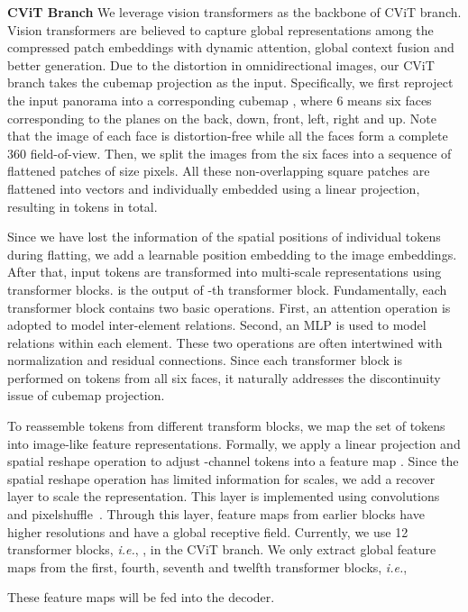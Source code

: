 \documentclass[10pt,twocolumn,letterpaper]{article}
\begin{document}
\textbf{CViT Branch }
We leverage vision transformers \cite{vit} as the backbone of CViT branch. Vision transformers are believed to capture global representations among the compressed patch embeddings with dynamic attention, global context fusion and better generation. Due to the distortion in omnidirectional images, our CViT branch takes the cubemap projection as the input. Specifically, we first reproject the input panorama  into a corresponding cubemap , where 6 means six faces corresponding to the planes on the back, down, front, left, right and up. Note that the image of each face is distortion-free while all the faces form a complete 360 field-of-view.
Then, we split the images from the six faces into a sequence of flattened patches of size  pixels. All these non-overlapping square patches are flattened into vectors and individually embedded using a linear projection, resulting in  tokens in total.

Since we have lost the information of the spatial positions of individual tokens during flatting, we add a learnable position embedding to the image embeddings.
After that, input tokens are transformed into multi-scale representations  using  transformer blocks.  is the output of -th transformer block. 
Fundamentally, each transformer block contains two basic operations. First, an attention operation is adopted to model inter-element relations. Second, an MLP is used to model relations within each element. These two operations are often intertwined with normalization and residual connections. Since each transformer block is performed on tokens from all six faces, it naturally addresses the discontinuity issue of cubemap projection.

To reassemble tokens from different transform blocks, we map the set of tokens into image-like feature representations. Formally, we apply a linear projection and spatial reshape operation to adjust  -channel tokens  into a feature map . Since the spatial reshape operation has limited information for scales, we add a recover layer to scale the representation. This layer is implemented using  convolutions and pixelshuffle~\cite{pixelshuffle}. Through this layer, feature maps from earlier blocks have higher resolutions and have a global receptive field. Currently, we use 12 transformer blocks, \emph{i.e.}, , in the CViT branch. We only extract global feature maps from the first, fourth, seventh and twelfth transformer blocks, \emph{i.e.},

These feature maps will be fed into the decoder.
\end{document}
